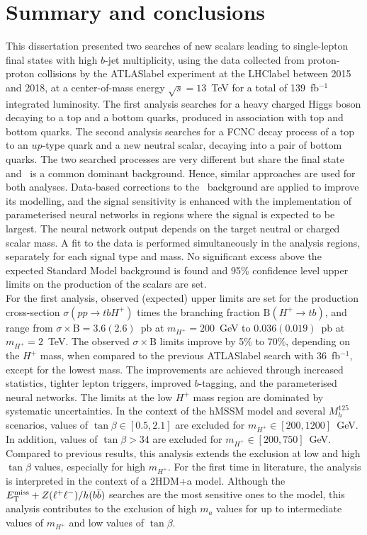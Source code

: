 \chapter{Summary and conclusions}
\label{chapter:summary}

This dissertation presented two searches of new scalars leading to single-lepton final states with high $b$-jet multiplicity, using the data collected from proton-proton collisions by the \acrshort{ATLASlabel} experiment at the \acrshort{LHClabel} between 2015 and 2018, at a center-of-mass energy $\sqrt{s}=13$~TeV for a total of 139~fb$^{-1}$ integrated luminosity. The first analysis searches for a heavy charged Higgs boson decaying to a top and a bottom quarks, produced in association with top and bottom quarks. The second analysis searches for a FCNC decay process of a top to an $up$-type quark and a new neutral scalar, decaying into a pair of bottom quarks. The two searched processes are very different but share the final state and \ttjets\ is a common dominant background. Hence, similar approaches are used for both analyses. Data-based corrections to the \ttbar\ background are applied to improve its modelling, and the signal sensitivity is enhanced with the implementation of parameterised neural networks in regions where the signal is expected to be largest. The neural network output depends on the target neutral or charged scalar mass. A fit to the data is performed simultaneously in the analysis regions, separately for each signal type and mass. No significant excess above the expected Standard Model background is found and 95\% confidence level upper limits on the production of the scalars are set.\\

For the first analysis, observed (expected) upper limits are set for the production cross-section $\sigma(pp\to tb H^+)$ times the branching fraction $\text{B}(H^+\to tb)$, and range from $\sigma\times\text{B}=3.6(2.6)$~pb at $m_{H^+}=200$~GeV to $0.036(0.019)$~pb at $m_{H^+}=2$~TeV. The observed $\sigma\times\text{B}$ limits improve by 5\% to 70\%, depending on the $H^+$ mass, when compared to the previous \acrshort{ATLASlabel} search with 36~fb$^{-1}$, except for the lowest mass. The improvements are achieved through increased statistics, tighter lepton triggers, improved $b$-tagging, and the parameterised neural networks. The limits at the low $H^+$ mass region are dominated by systematic uncertainties. In the context of the hMSSM model and several $M_{h}^{125}$ scenarios, values of $\tan\beta\in[0.5,2.1]$ are excluded for $m_{H^+}\in[200,1200]$~GeV. In addition, values of $\tan\beta>34$ are excluded for $m_{H^+}\in[200,750]$~GeV. Compared to previous results, this analysis extends the exclusion at low and high $\tan\beta$ values, especially for high $m_{H^+}$. For the first time in literature, the analysis is interpreted in the context of a 2HDM+a model. Although the $E_{\text{T}}^{\text{miss}}+Z(\ell^+\ell^-)/h(b\bar{b})$ searches are the most sensitive ones to the model, this analysis contributes to the exclusion of high $m_a$ values for up to intermediate values of $m_{H^+}$ and low values of $\tan\beta$.\\

